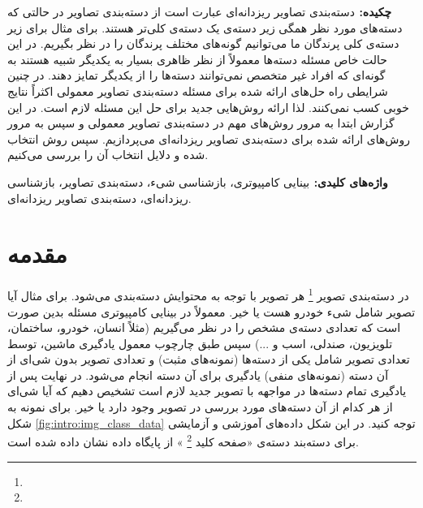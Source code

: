 \documentclass[11pt]{article}
\begin{document}

\usepackage{pifont}
\newcommand{\cmark}{\ding{51}}


{\bf {چکيده: }}
دسته‌بندی تصاویر ریزدانه‌ای عبارت است از دسته‌بندی تصاویر در حالتی که دسته‌های مورد نظر همگی زیر دسته‌ی یک دسته‌ی کلی‌تر هستند. برای مثال برای زیر دسته‌ی کلی پرندگان ما می‌توانیم گونه‌های مختلف پرندگان را در نظر بگیریم. در این حالت خاص مسئله دسته‌ها معمولاً از نظر ظاهری بسیار به یکدیگر شبیه هستند به گونه‌ای که افراد غیر متخصص نمی‌توانند دسته‌ها را از یکدیگر تمایز دهند. در چنین شرایطی راه حل‌های ارائه شده برای مسئله دسته‌بندی تصاویر معمولی اکثراً نتایج خوبی کسب نمی‌کنند. لذا ارائه روش‌هایی جدید برای حل این مسئله لازم است.
در این گزارش ابتدا به مرور روش‌های مهم در دسته‌بندی تصاویر معمولی و سپس به مرور روش‌های ارائه شده برای دسته‌بندی تصاویر ریزدانه‌ای می‌پردازیم. سپس روش انتخاب شده و دلایل انتخاب آن را بررسی می‌کنیم.


{\bf  { واژه‌های کلیدی: }}
بینایی کامپیوتری، بازشناسی شیء، دسته‌بندی تصاویر، بازشناسی ریزدانه‌ای، دسته‌بندی تصاویر ریزدانه‌ای.

\setlength{\parindent}{0.25in} %

\section{مقدمه}\label{sec:intro}
در دسته‌بندی تصویر 
\footnote{}
هر تصویر با توجه به محتوایش دسته‌بندی می‌شود. برای مثال آیا تصویر شامل شی‌ء خودرو هست یا خیر. معمولاً در بینایی کامپیوتری مسئله بدین صورت است که تعدادی دسته‌ی مشخص را در نظر می‌گیریم (مثلاً انسان، خودرو، ساختمان، تلویزیون، صندلی، اسب و ...) سپس طبق چارچوب معمول یادگیری ماشین، توسط تعدادی تصویر شامل یکی از دسته‌ها (نمونه‌های مثبت) و تعدادی تصویر بدون شی‌ای از آن دسته (نمونه‌های منفی) یادگیری برای آن دسته انجام می‌شود. در نهایت پس از یادگیری تمام دسته‌ها در مواجهه با تصویر جدید لازم است تشخیص دهیم که آیا شی‌ای از هر کدام از آن دسته‌های مورد بررسی در تصویر وجود دارد یا خیر.
برای نمونه به شکل
\ref{fig:intro:img_class_data}
توجه کنید. در این شکل داده‌های آموزشی و آزمایشی برای دسته‌بند دسته‌ی «صفحه کلید
\footnote{}
» از پایگاه داده
 \cite{caltech256}
 نشان داده شده است.
\end{document}
